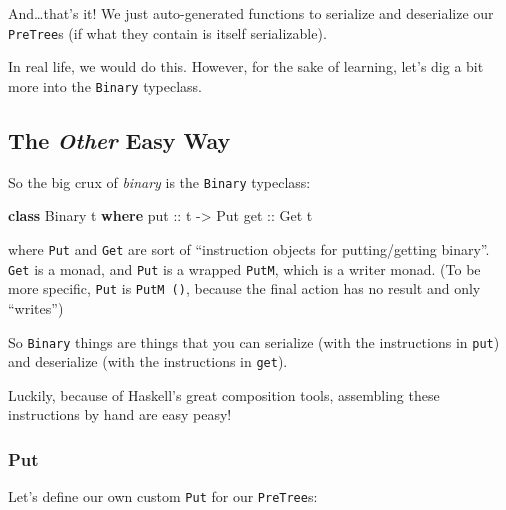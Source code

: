 \documentclass[]{article}
\newenvironment{Shaded}{}{}
\newcommand{\DataTypeTok}[1]{\textcolor[rgb]{0.56,0.13,0.00}{#1}}
\newcommand{\KeywordTok}[1]{\textcolor[rgb]{0.00,0.44,0.13}{\textbf{#1}}}
\newcommand{\NormalTok}[1]{#1}
\newcommand{\OtherTok}[1]{\textcolor[rgb]{0.00,0.44,0.13}{#1}}
\begin{document}
And\ldots that's it! We just auto-generated functions to serialize and
deserialize our \texttt{PreTree}s (if what they contain is itself serializable).

In real life, we would do this. However, for the sake of learning, let's dig a
bit more into the \texttt{Binary} typeclass.

\hypertarget{the-other-easy-way}{%
\subsection{\texorpdfstring{The \emph{Other} Easy
Way}{The Other Easy Way}}\label{the-other-easy-way}}

So the big crux of \emph{binary} is the \texttt{Binary} typeclass:

\begin{Shaded}
\begin{Highlighting}[]
\KeywordTok{class} \DataTypeTok{Binary}\NormalTok{ t }\KeywordTok{where}
\OtherTok{    put ::}\NormalTok{ t }\OtherTok{{-}>} \DataTypeTok{Put}
\OtherTok{    get ::} \DataTypeTok{Get}\NormalTok{ t}
\end{Highlighting}
\end{Shaded}

where \texttt{Put} and \texttt{Get} are sort of ``instruction objects for
putting/getting binary''. \texttt{Get} is a monad, and \texttt{Put} is a wrapped
\texttt{PutM}, which is a writer monad. (To be more specific, \texttt{Put} is
\texttt{PutM\ ()}, because the final action has no result and only ``writes'')

So \texttt{Binary} things are things that you can serialize (with the
instructions in \texttt{put}) and deserialize (with the instructions in
\texttt{get}).

Luckily, because of Haskell's great composition tools, assembling these
instructions by hand are easy peasy!

\hypertarget{put}{%
\subsubsection{Put}\label{put}}

Let's define our own custom \texttt{Put} for our \texttt{PreTree}s:
\end{document}
